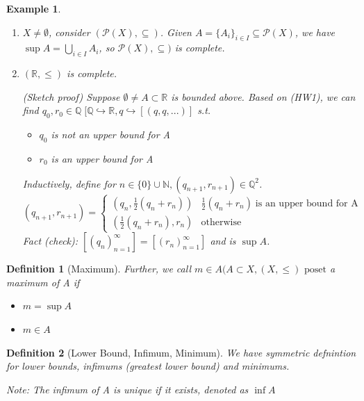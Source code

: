 \documentclass[11pt, oneside]{book}
\theoremstyle{break}
\newtheorem{defn}{Definition}[section]
\newtheorem{eg}{Example}[section]
\newcommand{\bb}[1]{\mathbb{#1}}			%
\begin{document}
\begin{eg}
	\begin{enumerate}
		\item $X \neq \emptyset$, consider $(\mathcal{P}(X), \subseteq)$. Given $A = \{A_i\}_{i \in I} \subseteq \mathcal{P}(X)$, we have $\sup A = \bigcup_{i \in I} A_i$, so $\mathcal{P}(X), \subseteq)$ is complete.

		\item $(\bb{R}, \leq)$ is complete.

			(Sketch proof) Suppose $\emptyset \neq A \subset \bb{R}$ is bounded above. Based on (HW1), we can find $q_0, r_0 \in \bb{Q} \; [\bb{Q} \hookrightarrow \bb{R}, q \hookrightarrow [(q, q, ...)]$ s.t.
			\begin{itemize}
				\item $q_0$ is not an upper bound for A
				\item $r_0$ is an upper bound for A
			\end{itemize}
			Inductively, define for $n \in \{0\} \cup \bb{N}, (q_{n + 1}, r_{n + 1}) \in \bb{Q}^2$.
			\begin{equation}
				(q_{n + 1}, r_{n + 1}) =
				\begin{cases}
					(q_n, \frac{1}{2} (q_n + r_n)) & \frac{1}{2} (q_n + r_n) \; \text{is an upper bound for A} \\
					(\frac{1}{2} (q_n + r_n), r_n) & \text{otherwise}
				\end{cases}
			\end{equation}
			Fact (check): $[(q_n)_{n = 1}^\infty] = [(r_n)_{n = 1}^\infty]$ and is $\sup A$.
	\end{enumerate}
\end{eg}

\begin{defn}[Maximum]
	Further, we call $m \in A (A \subset X, (X, \leq) \text{ poset}$ a maximum of A if
	\begin{itemize}
		\item $m = \sup A$
		\item $m \in A$
	\end{itemize}
\end{defn}

\begin{defn}[Lower Bound, Infimum, Minimum]
	We have symmetric defnintion for lower bounds, infimums (greatest lower bound) and minimums.

	Note: The infimum of A is unique if it exists, denoted as $\inf A$
\end{defn}
\end{document}
